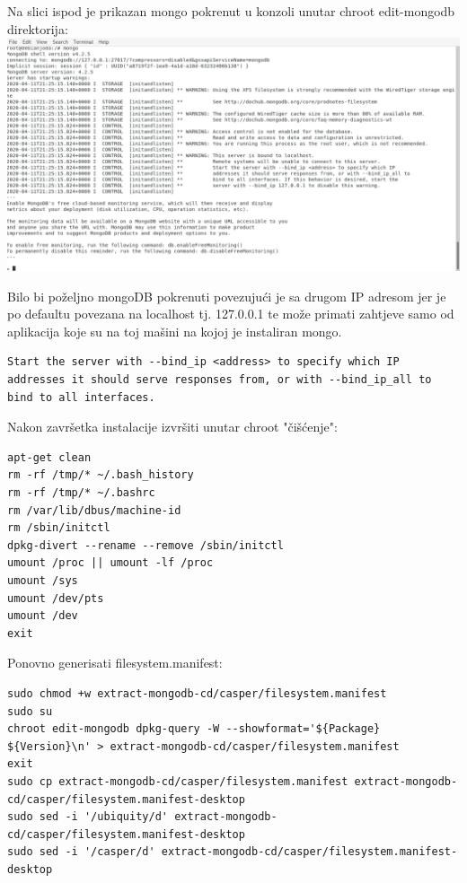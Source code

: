 \documentclass[12pt,vi]{mitthesis}
\begin{document}
Na slici ispod je prikazan mongo pokrenut u konzoli unutar chroot edit-mongodb direktorija:\\
\includegraphics[width=\linewidth]{images/mongoRunning.png}

Bilo bi poželjno mongoDB pokrenuti povezujući je sa drugom IP adresom jer je po defaultu povezana na localhost tj. 127.0.0.1 te može primati zahtjeve samo od aplikacija koje su na toj mašini na kojoj je instaliran mongo.
\begin{lstlisting}[style=BashInputStyle]
Start the server with --bind_ip <address> to specify which IP addresses it should serve responses from, or with --bind_ip_all to bind to all interfaces.
\end{lstlisting}
\noindent
Nakon završetka instalacije izvršiti unutar chroot "čišćenje":
\begin{lstlisting}[style=BashInputStyle]
apt-get clean
rm -rf /tmp/* ~/.bash_history
rm -rf /tmp/* ~/.bashrc
rm /var/lib/dbus/machine-id
rm /sbin/initctl
dpkg-divert --rename --remove /sbin/initctl
umount /proc || umount -lf /proc
umount /sys
umount /dev/pts
umount /dev
exit
\end{lstlisting}

\noindent
Ponovno generisati filesystem.manifest:
\begin{lstlisting}[style=BashInputStyle]
sudo chmod +w extract-mongodb-cd/casper/filesystem.manifest
sudo su
chroot edit-mongodb dpkg-query -W --showformat='${Package} ${Version}\n' > extract-mongodb-cd/casper/filesystem.manifest
exit
sudo cp extract-mongodb-cd/casper/filesystem.manifest extract-mongodb-cd/casper/filesystem.manifest-desktop
sudo sed -i '/ubiquity/d' extract-mongodb-cd/casper/filesystem.manifest-desktop
sudo sed -i '/casper/d' extract-mongodb-cd/casper/filesystem.manifest-desktop
\end{lstlisting}
\end{document}
